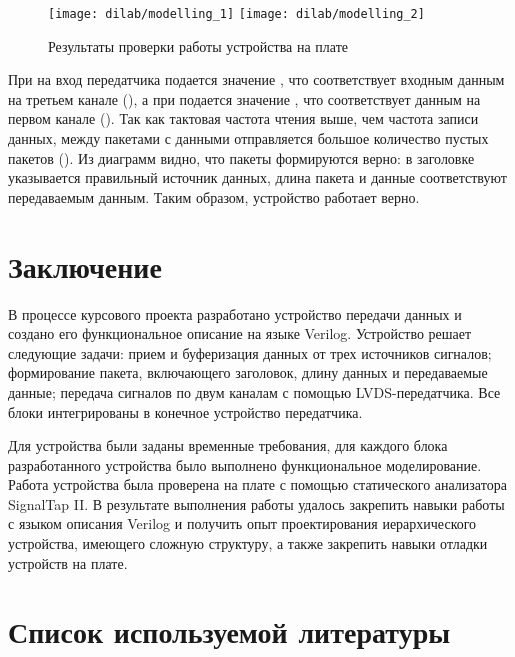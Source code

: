 \begin{figure}[H]
	\centering
	\texttt{[image: dilab/modelling\_1]}
	\texttt{[image: dilab/modelling\_2]}
	\caption{Результаты проверки работы устройства на плате}
	\label{fig:dilab_modelling}
\end{figure}

При  на вход передатчика подается значение , что соответствует входным данным на третьем канале (), а при  подается значение , что соответствует данным на первом канале (). Так как тактовая частота чтения выше, чем частота записи данных, между пакетами с данными отправляется большое количество пустых пакетов (). Из диаграмм видно, что пакеты формируются верно: в заголовке указывается правильный источник данных, длина пакета и данные соответствуют передаваемым данным. Таким образом, устройство работает верно.

\newpage

\section*{Заключение}

В процессе курсового проекта разработано устройство передачи данных и создано его функциональное описание на языке Verilog. Устройство решает следующие задачи: прием и буферизация данных от трех источников сигналов; формирование пакета, включающего заголовок, длину данных и передаваемые данные; передача сигналов по двум каналам с помощью LVDS-передатчика. Все блоки интегрированы в конечное устройство передатчика. 

Для устройства были заданы временные требования, для каждого блока разработанного устройства было выполнено функциональное моделирование. Работа устройства была проверена на плате с помощью статического анализатора SignalTap II. В результате выполнения работы удалось закрепить навыки работы с языком описания Verilog и получить опыт проектирования иерархического устройства, имеющего сложную структуру, а также закрепить навыки отладки устройств на плате.

\newpage

\section*{Список используемой литературы}


